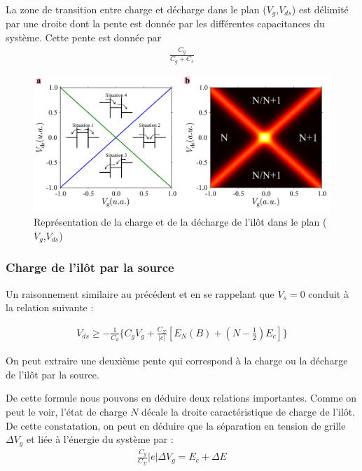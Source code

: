 La zone de transition entre charge et décharge dans le plan ($V_g$,$V_{ds}$) est délimité par une droite dont la pente est donnée par les différentes capacitances du système. Cette pente est donnée par 
\begin{eqnarray}
\frac{C_g}{C_g + C_s}
\end{eqnarray}



\begin{figure}
\includegraphics[scale=0.5]{Theorie/Transport/figure3/figure3.pdf} 
\caption{Représentation de la charge et de la décharge de l'il\^ot dans le plan ($V_g$,$V_{ds}$)}
\label{charge_discharge}
\end{figure}



\subsubsection{Charge de l'il\^ot par la source}
Un raisonnement similaire au précédent et en se rappelant que $V_s = 0$ conduit à la relation suivante :

\begin{eqnarray}
V_{ds} \geq -\frac{1}{C_d} \{C_gV_g + \frac{C_{\Sigma}}{|e|}[E_N(B) + (N-\frac{1}{2})E_c] \}
\end{eqnarray}


On peut extraire une deuxième pente qui correspond à la charge ou la décharge de l'il\^ot par la source.

De cette formule nous pouvons en déduire deux relations importantes. Comme on peut le voir, l'état de charge $N$ décale la droite caractéristique de charge de l'il\^ot. De cette constatation, on peut en déduire que la séparation en tension de grille $\Delta V_g$ et liée à l'énergie du système par :
\begin{eqnarray}
\frac{C_g}{C_{\Sigma}} |e| \Delta V_g = E_c + \Delta E
\end{eqnarray}

